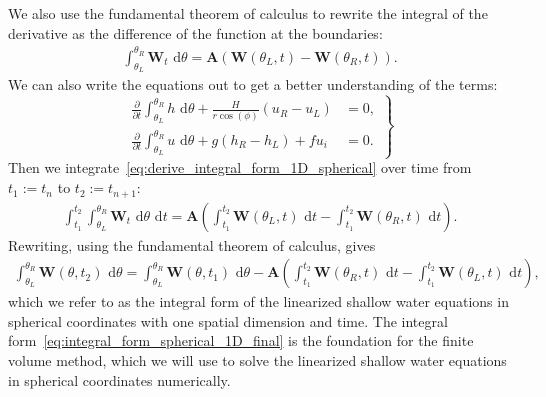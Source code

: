 We also use the fundamental theorem of calculus to rewrite the integral of the derivative as the difference of the function at the boundaries:
\begin{align}\label{eq:derive_integral_form_1D_spherical}
    \int_{\theta_L}^{\theta_R} \mathbf{W}_t \text{ d}\theta =  \mathbf{A} \left( \mathbf{W}(\theta_L, t) - \mathbf{W}(\theta_R, t) \right).
\end{align}
We can also write the equations out to get a better understanding of the terms:
\begin{equation}\label{eq:integral_form_spherical_1D}
    \left.
    \begin{aligned}
        \frac{\partial}{\partial t} \int_{\theta_L}^{\theta_R} h \text{ d}\theta + \frac{H}{r \cos(\phi)} (u_R - u_L) &= 0, \\
        \frac{\partial}{\partial t} \int_{\theta_L}^{\theta_R} u \text{ d}\theta + g(h_R - h_L) + fu_i &= 0.
    \end{aligned}
    \right\}
\end{equation}
Then we integrate~\eqref{eq:derive_integral_form_1D_spherical} over time from $t_1 := t_n$ to $t_2 := t_{n+1}$:
\begin{align*}
    \int_{t_1}^{t_2} \int_{\theta_L}^{\theta_R} \mathbf{W}_t \text{ d}\theta \text{ d}t = \mathbf{A} \left( \int_{t_1}^{t_2} \mathbf{W}(\theta_L, t) \text{ d}t - \int_{t_1}^{t_2} \mathbf{W}(\theta_R, t) \text{ d}t \right).
\end{align*}
Rewriting, using the fundamental theorem of calculus, gives
\begin{align}\label{eq:integral_form_spherical_1D_final}
    \int_{\theta_L}^{\theta_R} \mathbf{W}(\theta, t_2) \text{ d}\theta = \int_{\theta_L}^{\theta_R} \mathbf{W}(\theta, t_1) \text{ d}\theta
    - \mathbf{A} \left( \int_{t_1}^{t_2} \mathbf{W}(\theta_R, t) \text{ d}t - \int_{t_1}^{t_2} \mathbf{W}(\theta_L, t) \text{ d}t \right),
\end{align}
which we refer to as the integral form of the linearized shallow water equations in spherical coordinates with one spatial dimension and time.
The integral form~\eqref{eq:integral_form_spherical_1D_final} is the foundation for the finite volume method, which we will use to solve the linearized shallow water equations in spherical coordinates numerically.



